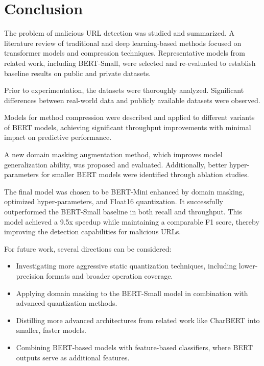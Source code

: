\chapter*{Conclusion}

The problem of malicious URL detection was studied and summarized. A literature review of traditional and deep learning-based methods focused on transformer models and compression techniques. Representative models from related work, including BERT-Small, were selected and re-evaluated to establish baseline results on public and private datasets.

Prior to experimentation, the datasets were thoroughly analyzed. Significant differences between real-world data and publicly available datasets were observed.

Models for method compression were described and applied to different variants of BERT models, achieving significant throughput improvements with minimal impact on predictive performance.

A new domain masking augmentation method, which improves model generalization ability, was proposed and evaluated. Additionally, better hyper-parameters for smaller BERT models were identified through ablation studies.

The final model was chosen to be BERT-Mini enhanced by domain masking, optimized hyper-parameters, and Float16 quantization. It successfully outperformed the BERT-Small baseline in both recall and throughput. This model achieved a 9.5x speedup while maintaining a comparable F1 score, thereby improving the detection capabilities for malicious URLs.

For future work, several directions can be considered:
\begin{itemize}
    \item Investigating more aggressive static quantization techniques, including lower-precision formats and broader operation coverage.
    \item Applying domain masking to the BERT-Small model in combination with advanced quantization methods.
    \item Distilling more advanced architectures from related work like CharBERT into smaller, faster models.
    \item Combining BERT-based models with feature-based classifiers, where BERT outputs serve as additional features.
\end{itemize}